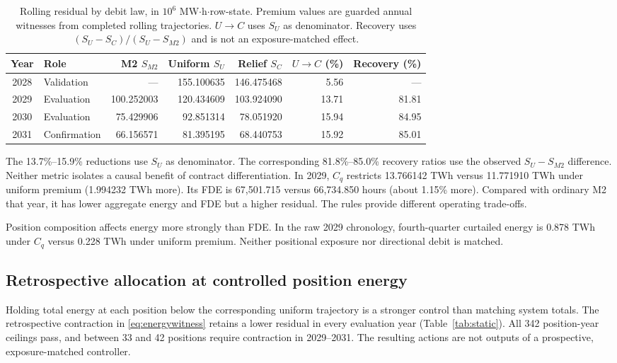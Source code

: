 \documentclass[10pt,journal]{IEEEtran}
\begin{document}
\begin{table}[t]
\centering
\caption{Rolling residual by debit law, in $10^6$ MW$\cdot$h$\cdot$row-state. Premium values are guarded annual witnesses from completed rolling trajectories. $U\!\to\!C$ uses $S_U$ as denominator. Recovery uses $(S_U-S_C)/(S_U-S_{M2})$ and is not an exposure-matched effect.}
\label{tab:premium}
\footnotesize
\begin{tabular}{@{}clrrrrr@{}}
\toprule
Year & Role & M2 $S_{M2}$ & Uniform $S_U$ & Relief $S_C$ & $U\!\to\!C$ (\%) & Recovery (\%)\\
\midrule
2028 & Validation & --- & 155.100635 & 146.475468 & 5.56 & ---\\
2029 & Evaluation & 100.252003 & 120.434609 & 103.924090 & 13.71 & 81.81\\
2030 & Evaluation & 75.429906 & 92.851314 & 78.051920 & 15.94 & 84.95\\
2031 & Confirmation & 66.156571 & 81.395195 & 68.440753 & 15.92 & 85.01\\
\bottomrule
\end{tabular}
\end{table}

The 13.7\%--15.9\% reductions use $S_U$ as denominator. The corresponding 81.8\%--85.0\% recovery ratios use the observed $S_U-S_{M2}$ difference. Neither metric isolates a causal benefit of contract differentiation. In 2029, $C_q$ restricts 13.766142 TWh versus 11.771910 TWh under uniform premium (1.994232 TWh more). Its FDE is 67,501.715 versus 66,734.850 hours (about 1.15\% more). Compared with ordinary M2 that year, it has lower aggregate energy and FDE but a higher residual. The rules provide different operating trade-offs.

Position composition affects energy more strongly than FDE. In the raw 2029 chronology, fourth-quarter curtailed energy is 0.878 TWh under $C_q$ versus 0.228 TWh under uniform premium. Neither positional exposure nor directional debit is matched.

\subsection{Retrospective allocation at controlled position energy}
Holding total energy at each position below the corresponding uniform trajectory is a stronger control than matching system totals. The retrospective contraction in \eqref{eq:energywitness} retains a lower residual in every evaluation year (Table~\ref{tab:static}). All 342 position-year ceilings pass, and between 33 and 42 positions require contraction in 2029--2031. The resulting actions are not outputs of a prospective, exposure-matched controller.
\end{document}
